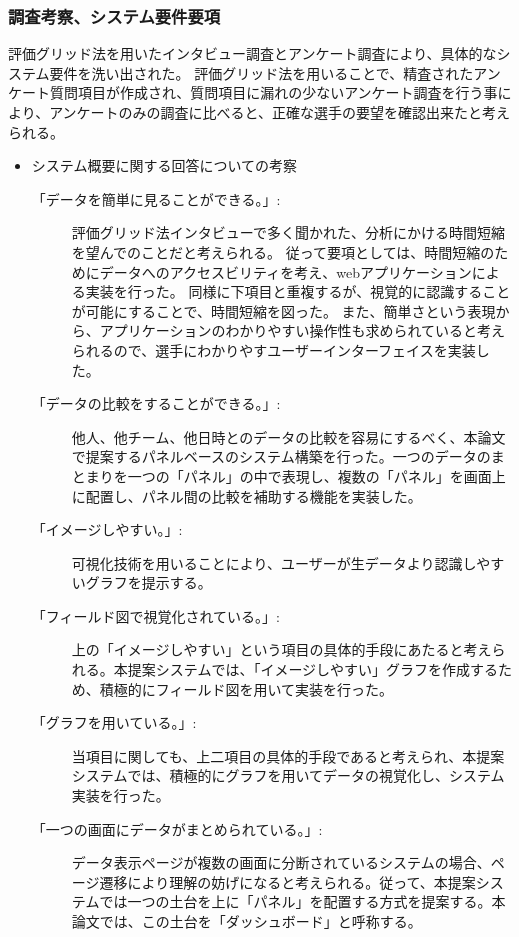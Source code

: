 \documentclass[sotsuron]{kuee}
\begin{document}
			\subsubsection{調査考察、システム要件要項}
				評価グリッド法を用いたインタビュー調査とアンケート調査により、具体的なシステム要件を洗い出された。
				評価グリッド法を用いることで、精査されたアンケート質問項目が作成され、質問項目に漏れの少ないアンケート調査を行う事により、アンケートのみの調査に比べると、正確な選手の要望を確認出来たと考えられる。
				\begin{itemize}
					\item システム概要に関する回答についての考察
						\begin{description}
							\item [「データを簡単に見ることができる。」:]
							評価グリッド法インタビューで多く聞かれた、分析にかける時間短縮を望んでのことだと考えられる。
							従って要項としては、時間短縮のためにデータへのアクセスビリティを考え、webアプリケーションによる実装を行った。
							同様に下項目と重複するが、視覚的に認識することが可能にすることで、時間短縮を図った。
							また、簡単さという表現から、アプリケーションのわかりやすい操作性も求められていると考えられるので、選手にわかりやすユーザーインターフェイスを実装した。
							\item [「データの比較をすることができる。」:]
							他人、他チーム、他日時とのデータの比較を容易にするべく、本論文で提案するパネルベースのシステム構築を行った。一つのデータのまとまりを一つの「パネル」の中で表現し、複数の「パネル」を画面上に配置し、パネル間の比較を補助する機能を実装した。
							\item [「イメージしやすい。」:]
							可視化技術を用いることにより、ユーザーが生データより認識しやすいグラフを提示する。
							\item [「フィールド図で視覚化されている。」:]
							上の「イメージしやすい」という項目の具体的手段にあたると考えられる。本提案システムでは、「イメージしやすい」グラフを作成するため、積極的にフィールド図を用いて実装を行った。
							\item [「グラフを用いている。」:]
							当項目に関しても、上二項目の具体的手段であると考えられ、本提案システムでは、積極的にグラフを用いてデータの視覚化し、システム実装を行った。
							\item [「一つの画面にデータがまとめられている。」:]
							データ表示ページが複数の画面に分断されているシステムの場合、ページ遷移により理解の妨げになると考えられる。従って、本提案システムでは一つの土台を上に「パネル」を配置する方式を提案する。本論文では、この土台を「ダッシュボード」と呼称する。

\end{description}
\end{itemize}
\end{document}
